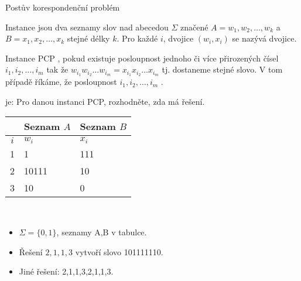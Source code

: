     \begin{frame}{Postův korespondenční problém}
    \begin{definition}
    Instance  jsou dva seznamy slov nad abecedou $\Sigma$ značené $A=w_1,w_2,\ldots, w_k$ a $B=x_1,x_2,\ldots, x_k$ stejné délky $k$. 
    \pause
    Pro každé $i$, dvojice $(w_i,x_i) $ se nazývá  dvojice. 
    \pause
    
    Instance PCP , pokud existuje posloupnost jednoho či více přirozených čísel ${i_1}, {i_2}, \ldots, {i_m}$ tak že $w_{i_1} w_{i_2} \ldots w_{i_m}=x_{i_1} x_{i_2} \ldots x_{i_m} $ tj. dostaneme stejné slovo.
    \pause
    V tom případě říkáme, že posloupnost ${i_1}, {i_2}, \ldots, {i_m}$  .
    \pause
    
     je: Pro danou instanci PCP, rozhodněte, zda má řešení.
    \end{definition}
    \pause
    \begin{example}
    \begin{minipage}{0.37\textwidth}
    \begin{tabular}{c | l | l}
     & Seznam $A$ & Seznam $B$\\
    \hline
    $i$ & $w_i$ & $x_i$ \\
    \hline
    1 & 1 & 111\\
    2 & 10111 & 10\\
    3 & 10 & 0 
    \end{tabular}
    \end{minipage}
    \begin{minipage}{0.01\textwidth}
    \ \end{minipage}
    \begin{minipage}{0.51\textwidth}
    \begin{itemize}
        \item $\Sigma=\{0,1\}$, seznamy A,B v tabulce.
        \item Řešení $2,1,1,3$ vytvoří slovo 101111110.
        \item Jiné řešení: 2,1,1,3,2,1,1,3.
    \end{itemize}
    \end{minipage}
    \end{example}
    \end{frame}
    
